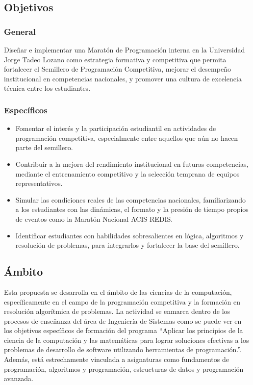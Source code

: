 \documentclass{article}
\begin{document}
\subsection{Objetivos}

\subsubsection{General}

Diseñar e implementar una Maratón de Programación interna en la Universidad Jorge Tadeo Lozano como estrategia formativa y competitiva que permita fortalecer el Semillero de Programación Competitiva, mejorar el desempeño institucional en competencias nacionales, y promover una cultura de excelencia técnica entre los estudiantes.

\subsubsection{Específicos}

\begin{itemize}
  \item Fomentar el interés y la participación estudiantil en actividades de programación competitiva, especialmente entre aquellos que aún no hacen parte del semillero.
  \item Contribuir a la mejora del rendimiento institucional en futuras competencias, mediante el entrenamiento competitivo y la selección temprana de equipos representativos.
  \item Simular las condiciones reales de las competencias nacionales, familiarizando a los estudiantes con las dinámicas, el formato y la presión de tiempo propios de eventos como la Maratón Nacional ACIS REDIS.
  \item Identificar estudiantes con habilidades sobresalientes en lógica, algoritmos y resolución de problemas, para integrarlos y fortalecer la base del semillero.
\end{itemize}


\subsection{Ámbito}


Esta propuesta se desarrolla en el ámbito de las ciencias de la computación, específicamente en el campo de la programación competitiva y la formación en resolución algorítmica de problemas. La actividad se enmarca dentro de los procesos de enseñanza del área de Ingeniería de Sistemas como se puede ver en los objetivos específicos de formación del programa ``Aplicar los principios de la ciencia de la computación y las matemáticas para lograr soluciones efectivas a los problemas de desarrollo de software utilizando herramientas de programación.''\cite{utadeo_sistemas}. Además, está estrechamente vinculada a asignaturas como fundamentos de programación, algoritmos y programación, estructuras de datos y programación avanzada.
\end{document}
